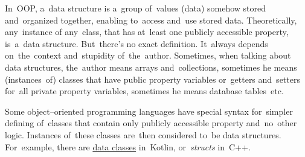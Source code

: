 \label{datastructure}
In~OOP, a~data structure is a~group of~values (data) somehow stored and~organized together, enabling to~access and~use stored data.
Theoretically, any~instance of any~class, that has at~least one publicly accessible property, is~a~data structure.
But~there's no exact definition.
It~always depends on~the~context and~stupidity of~the~author.
Sometimes, when talking about data structures, the~author means arrays and~collections, sometimes he means (instances~of) classes that have public property variables or~getters and~setters for~all private property variables, sometimes he means database tables~etc.

Some object--oriented programming languages have special syntax for~simpler defining of~classes that contain only publicly accessible property and~no~other logic.
Instances of~these classes are~then considered to~be data structures.
For~example, there are \hyperref[kotlindataclass]{data classes} in~Kotlin, \mbox{or \textit{structs}} in~C++.
